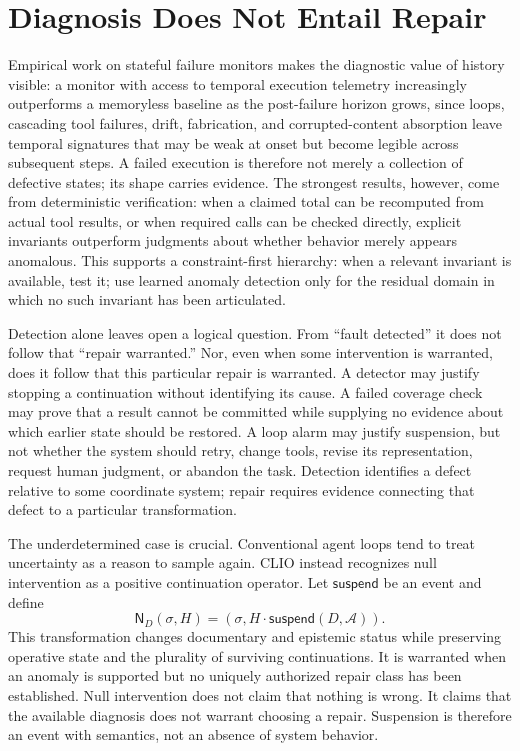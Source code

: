 \section{Diagnosis Does Not Entail Repair}

Empirical work on stateful failure monitors makes the diagnostic value of history visible: a monitor with access to temporal execution telemetry increasingly outperforms a memoryless baseline as the post-failure horizon grows, since loops, cascading tool failures, drift, fabrication, and corrupted-content absorption leave temporal signatures that may be weak at onset but become legible across subsequent steps. A failed execution is therefore not merely a collection of defective states; its shape carries evidence. The strongest results, however, come from deterministic verification: when a claimed total can be recomputed from actual tool results, or when required calls can be checked directly, explicit invariants outperform judgments about whether behavior merely appears anomalous. This supports a constraint-first hierarchy: when a relevant invariant is available, test it; use learned anomaly detection only for the residual domain in which no such invariant has been articulated.

Detection alone leaves open a logical question. From ``fault detected'' it does not follow that ``repair warranted.'' Nor, even when some intervention is warranted, does it follow that this particular repair is warranted. A detector may justify stopping a continuation without identifying its cause. A failed coverage check may prove that a result cannot be committed while supplying no evidence about which earlier state should be restored. A loop alarm may justify suspension, but not whether the system should retry, change tools, revise its representation, request human judgment, or abandon the task. Detection identifies a defect relative to some coordinate system; repair requires evidence connecting that defect to a particular transformation.

The underdetermined case is crucial. Conventional agent loops tend to treat uncertainty as a reason to sample again. CLIO instead recognizes null intervention as a positive continuation operator. Let $\mathsf{suspend}$ be an event and define
\[
\mathsf{N}_D(\sigma,H) = (\sigma, H \cdot \mathsf{suspend}(D,\mathcal{A})).
\]
This transformation changes documentary and epistemic status while preserving operative state and the plurality of surviving continuations. It is warranted when an anomaly is supported but no uniquely authorized repair class has been established. Null intervention does not claim that nothing is wrong. It claims that the available diagnosis does not warrant choosing a repair. Suspension is therefore an event with semantics, not an absence of system behavior.

